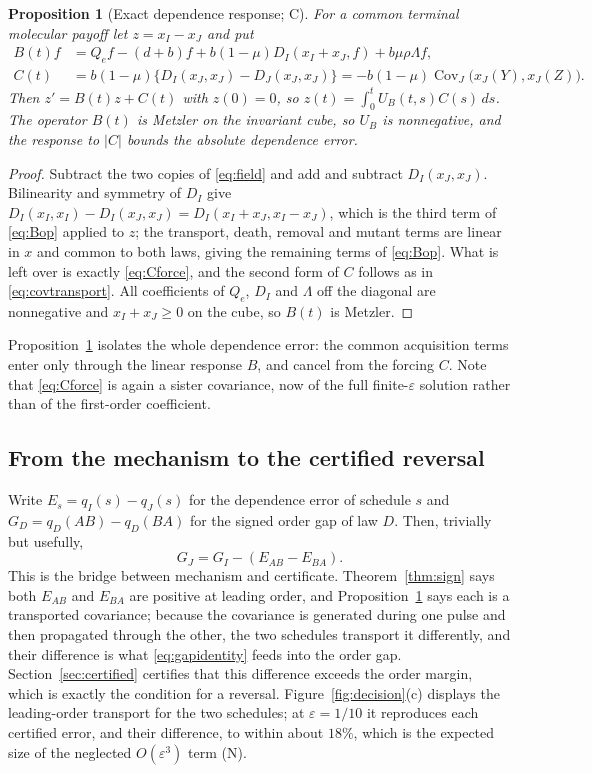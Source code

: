 \documentclass[11pt]{article}
\newtheorem{proposition}[theorem]{Proposition}
\theoremstyle{remark}
\newcommand{\eps}{\varepsilon}
\newcommand{\Cov}{\operatorname{Cov}}
\begin{document}
\begin{proposition}[Exact dependence response; C]\label{prop:exact}
For a common terminal molecular payoff let $z=x_I-x_J$ and put
\begin{align}
 B(t)f&=Q_ef-(d+b)f+b(1-\mu)D_I(x_I+x_J,f)+b\mu\rho\Lambda f,\label{eq:Bop}\\
 C(t)&=b(1-\mu)\bigl\{D_I(x_J,x_J)-D_J(x_J,x_J)\bigr\}
      =-b(1-\mu)\Cov_J\bigl(x_J(Y),x_J(Z)\bigr).\label{eq:Cforce}
\end{align}
Then $z'=B(t)z+C(t)$ with $z(0)=0$, so
$z(t)=\int_0^tU_B(t,s)C(s)\,ds$. The operator $B(t)$ is Metzler on the invariant
cube, so $U_B$ is nonnegative, and the response to $|C|$ bounds the absolute
dependence error.
\end{proposition}

\begin{proof}
Subtract the two copies of \eqref{eq:field} and add and subtract
$D_I(x_J,x_J)$. Bilinearity and symmetry of $D_I$ give
$D_I(x_I,x_I)-D_I(x_J,x_J)=D_I(x_I+x_J,x_I-x_J)$, which is the third term of
\eqref{eq:Bop} applied to $z$; the transport, death, removal and mutant terms are
linear in $x$ and common to both laws, giving the remaining terms of
\eqref{eq:Bop}. What is left over is exactly \eqref{eq:Cforce}, and the second
form of $C$ follows as in \eqref{eq:covtransport}. All coefficients of $Q_e$,
$D_I$ and $\Lambda$ off the diagonal are nonnegative and $x_I+x_J\ge0$ on the
cube, so $B(t)$ is Metzler.
\end{proof}

Proposition~\ref{prop:exact} isolates the whole dependence error: the common
acquisition terms enter only through the linear response $B$, and cancel from the
forcing $C$. Note that \eqref{eq:Cforce} is again a sister covariance, now of the
full finite-$\eps$ solution rather than of the first-order coefficient.

\subsection{From the mechanism to the certified reversal}
Write $E_s=q_I(s)-q_J(s)$ for the dependence error of schedule $s$ and
$G_D=q_D(AB)-q_D(BA)$ for the signed order gap of law $D$. Then, trivially but
usefully,
\begin{equation}
 G_J=G_I-(E_{AB}-E_{BA}).\label{eq:gapidentity}
\end{equation}
This is the bridge between mechanism and certificate. Theorem~\ref{thm:sign} says
both $E_{AB}$ and $E_{BA}$ are positive at leading order, and
Proposition~\ref{prop:exact} says each is a transported covariance; because the
covariance is generated during one pulse and then propagated through the other,
the two schedules transport it differently, and their difference is what
\eqref{eq:gapidentity} feeds into the order gap. Section~\ref{sec:certified}
certifies that this difference exceeds the order margin, which is exactly the
condition for a reversal. Figure~\ref{fig:decision}(c) displays the leading-order
transport for the two schedules; at $\eps=1/10$ it reproduces each certified
error, and their difference, to within about $18\%$, which is the expected size
of the neglected $O(\eps^3)$ term \textup{(N)}.
\end{document}
